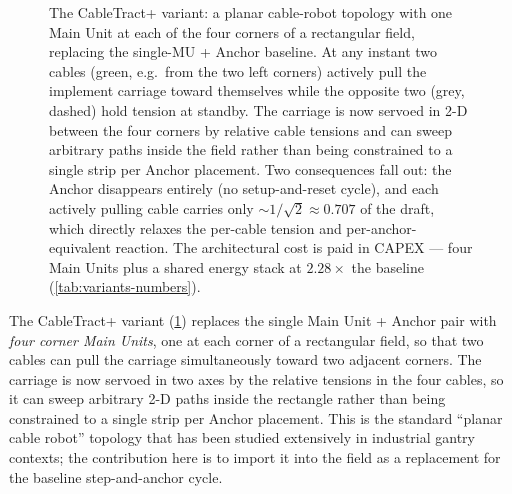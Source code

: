 \documentclass[11pt,a4paper]{article}
\begin{document}
\begin{figure}[H]
{%
}
\caption{The CableTract+ variant: a planar cable-robot topology with one Main Unit at each of the four corners of a rectangular field, replacing the single-MU + Anchor baseline. At any instant two cables (\textcolor{green!50!black}{green}, e.g.\ from the two left corners) actively pull the implement carriage toward themselves while the opposite two (\textcolor{gray!40!black}{grey}, dashed) hold tension at standby. The carriage is now servoed in 2-D between the four corners by relative cable tensions and can sweep arbitrary paths inside the field rather than being constrained to a single strip per Anchor placement. Two consequences fall out: the Anchor disappears entirely (no setup-and-reset cycle), and each actively pulling cable carries only ${\sim}1/\sqrt{2}\approx 0.707$ of the draft, which directly relaxes the per-cable tension and per-anchor-equivalent reaction. The architectural cost is paid in CAPEX --- four Main Units plus a shared energy stack at $2.28\times$ the baseline (\cref{tab:variants-numbers}).}
\label{fig:f0e}
\end{figure}

The CableTract+ variant (\cref{fig:f0e}) replaces the single Main Unit + Anchor pair with \emph{four corner Main Units}, one at each corner of a rectangular field, so that two cables can pull the carriage simultaneously toward two adjacent corners. The carriage is now servoed in two axes by the relative tensions in the four cables, so it can sweep arbitrary 2-D paths inside the rectangle rather than being constrained to a single strip per Anchor placement. This is the standard ``planar cable robot'' topology that has been studied extensively in industrial gantry contexts; the contribution here is to import it into the field as a replacement for the baseline step-and-anchor cycle.
\end{document}
